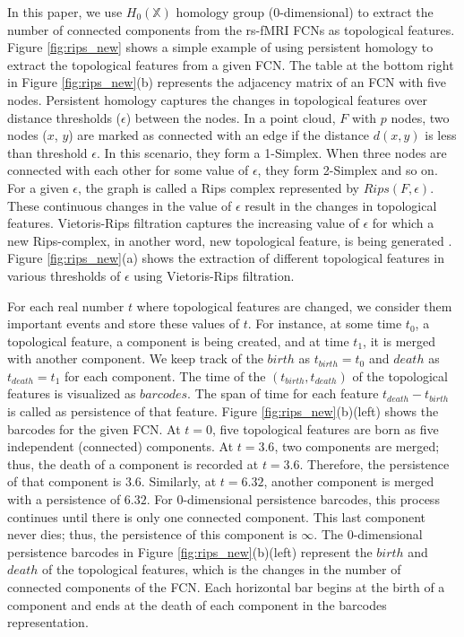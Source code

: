 In this paper, we use $H_0(\mathbb{X})$ homology group (0-dimensional) to extract the number of connected components from the rs-fMRI FCNs as topological features. Figure \ref{fig:rips_new} shows a simple example of using persistent homology to extract the topological features from a given FCN. The table at the bottom right in Figure \ref{fig:rips_new}(b) represents the adjacency matrix of an FCN with five nodes. Persistent homology captures the changes in topological features over distance thresholds ($\epsilon$) between the nodes. In a point cloud, $F$ with $p$ nodes, two nodes ($x$, $y$) are marked as connected with an edge if the distance $d(x, y)$ is less than threshold $\epsilon$. In this scenario, they form a 1-Simplex. When three nodes are connected with each other for some value of $\epsilon$, they form 2-Simplex and so on. For a given $\epsilon$, the graph is called a Rips complex represented by $Rips(F , \epsilon)$. These continuous changes in the value of $\epsilon$ result in the changes in topological features. Vietoris-Rips filtration captures the increasing value of $\epsilon$ for which a new Rips-complex, in another word, new topological feature, is being generated \cite{bauer2021ripser}. Figure \ref{fig:rips_new}(a) shows the extraction of different topological features in various thresholds of $\epsilon$ using Vietoris-Rips filtration. 

For each real number $t$ where topological features are changed, we consider them important events and store these values of $t$. For instance, at some time $t_0$, a topological feature, a component is being created, and at time $t_1$, it is merged with another component. We keep track of the $birth$ as $t_{birth} = t_0$ and $death$ as $t_{death} = t_1$ for each component. The time of the $(t_{birth}, t_{death})$ of the topological features is visualized as $barcodes$. The span of time for each feature $t_{death} - t_{birth}$ is called as persistence of that feature. Figure \ref{fig:rips_new}(b)(left) shows the barcodes for the given FCN. At $t=0$, five topological features are born as five independent (connected) components. At $t=3.6$, two components are merged; thus, the death of a component is recorded at $t=3.6$. Therefore, the persistence of that component is $3.6$. Similarly, at $t=6.32$, another component is merged with a persistence of $6.32$. For 0-dimensional persistence barcodes, this process continues until there is only one connected component. This last component never dies; thus, the persistence of this component is $\infty$. The 0-dimensional persistence barcodes in Figure \ref{fig:rips_new}(b)(left) represent the $birth$ and $death$ of the topological features, which is the changes in the number of connected components of the FCN. Each horizontal bar begins at the birth of a component and ends at the death of each component in the barcodes representation. 

